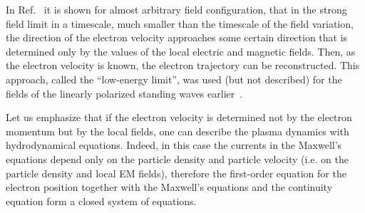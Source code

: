 
In Ref.~\cite{Gonoskov17} it is shown for almost arbitrary field configuration, that in the strong
field limit in a timescale, much smaller than the timescale of the field variation, the direction of the
electron velocity approaches some certain direction that is determined only by the values of the
local electric and magnetic fields. Then, as the electron velocity is known, the electron
trajectory can be reconstructed. This approach, called the ``low-energy limit'', was used (but not
described) for the fields of the linearly polarized standing waves earlier~\cite{Gonoskov14}.

Let us emphasize that if the electron velocity is determined not by the electron momentum but
by the local fields, one can describe the plasma dynamics with hydrodynamical equations. Indeed,
in this case the currents in the Maxwell's equations depend only on the particle density and
particle velocity (i.e. on the particle density and local EM fields), therefore the first-order
equation for the electron position together with the
Maxwell's equations and the continuity equation form a closed system of equations.

